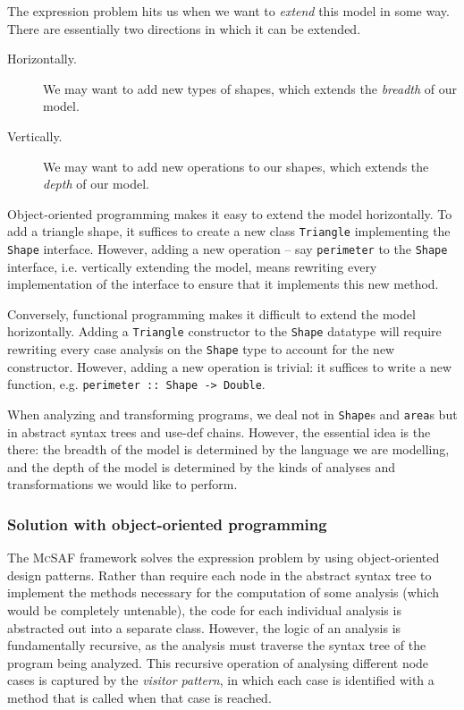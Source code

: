 \documentclass[letterpaper,11pt]{article}
\newcommand{\codesnip}{\texttt}
\newcommand{\typename}{\codesnip}
\newcommand{\mcsaf}{\textsc{McSAF}}
\begin{document}
The expression problem hits us when we want to \emph{extend} this model in some
way. There are essentially two directions in which it can be extended.
\begin{description}
  \item[Horizontally.] We may want to add new types of shapes, which extends
    the \emph{breadth} of our model.
  \item[Vertically.] We may want to add new operations to our shapes, which
    extends the \emph{depth} of our model.
\end{description}

Object-oriented programming makes it easy to extend the model horizontally. To
add a triangle shape, it suffices to create a new class \typename{Triangle}
implementing the \typename{Shape} interface. However, adding a new operation --
say \texttt{perimeter} to the \typename{Shape} interface, i.e. vertically
extending the model, means rewriting every implementation of the interface to
ensure that it implements this new method.

Conversely, functional programming makes it difficult to extend the model
horizontally. Adding a \typename{Triangle} constructor to the \typename{Shape}
datatype will require rewriting every case analysis on the \typename{Shape}
type to account for the new constructor. However, adding a new operation is
trivial: it suffices to write a new function, e.g.
\codesnip{perimeter :: Shape -> Double}.

When analyzing and transforming programs, we deal not in \typename{Shape}s and
\codesnip{area}s but in abstract syntax trees and use-def chains. However, the
essential idea is the there: the breadth of the model is determined by the
language we are modelling, and the depth of the model is determined by the
kinds of analyses and transformations we would like to perform.

\subsubsection{Solution with object-oriented programming}

The \mcsaf{} framework\cite{McSAF} solves the expression problem by using
object-oriented design patterns. Rather than require each node in the abstract
syntax tree to implement the methods necessary for the computation of some
analysis (which would be completely untenable), the code for each individual
analysis is abstracted out into a separate class. However, the logic of an
analysis is fundamentally recursive, as the analysis must traverse the syntax
tree of the program being analyzed. This recursive operation of analysing
different node cases is captured by the \emph{visitor pattern}, in which each
case is identified with a method that is called when that case is reached.
\end{document}
